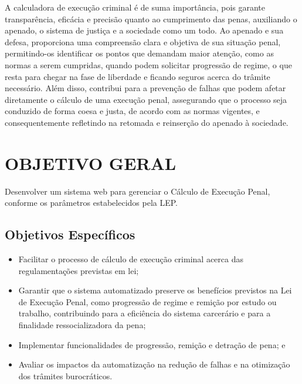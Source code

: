 A calculadora de execução criminal é de suma importância, pois garante transparência, eficácia e precisão quanto ao cumprimento das penas, auxiliando o apenado, o sistema de justiça e a sociedade como um todo.  Ao apenado e sua defesa, proporciona uma compreensão clara e objetiva de sua situação penal, permitindo-os identificar os pontos que demandam maior atenção, como as normas a serem cumpridas, quando podem solicitar progressão de regime, o que resta para chegar na fase de liberdade e ficando seguros acerca do trâmite necessário. Além disso, contribui para a prevenção de falhas que podem afetar diretamente o cálculo de uma execução penal, assegurando que o processo seja conduzido de forma coesa e justa, de acordo com as normas vigentes, e consequentemente refletindo na retomada e reinserção do apenado à sociedade.

\section{OBJETIVO GERAL}

Desenvolver um sistema web para gerenciar o Cálculo de Execução Penal, conforme os parâmetros estabelecidos pela LEP.

\subsection{Objetivos Específicos}
\begin{itemize}
\item Facilitar o processo de cálculo de execução criminal 
acerca das regulamentações previstas em lei;
\item Garantir que o sistema automatizado preserve os 
benefícios previstos na Lei de Execução Penal, como progressão de regime e remição por estudo ou trabalho, contribuindo para a eficiência do sistema carcerário e para a finalidade ressocializadora da pena;
\item Implementar funcionalidades de progressão, remição e 
detração de pena; e
\item Avaliar os impactos da automatização na redução de falhas e na otimização dos trâmites burocráticos.
\end{itemize}
